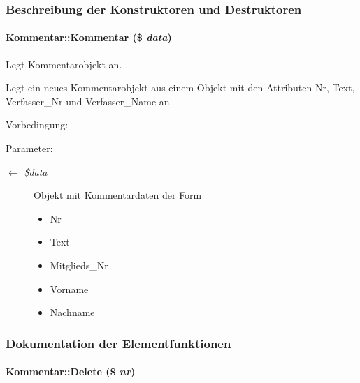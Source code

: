 \subsubsection{Beschreibung der Konstruktoren und Destruktoren}
\hypertarget{classKommentar_ea774e2108c754890c602dfdd53d64e1}{
\paragraph[Kommentar]{\setlength{\rightskip}{0pt plus 5cm}Kommentar::Kommentar (\$ {\em data})}\hfill}
\label{classKommentar_ea774e2108c754890c602dfdd53d64e1}


Legt Kommentarobjekt an. 

Legt ein neues Kommentarobjekt aus einem Objekt mit den Attributen Nr, Text, Verfasser\_\-Nr und Verfasser\_\-Name an. \begin{Desc}
\item[Vorbedingung:]- \end{Desc}
\begin{Desc}
\item[Parameter:]
\begin{description}
\item[\mbox{$\leftarrow$} {\em \$data}]Objekt mit Kommentardaten der Form\begin{itemize}
\item Nr\item Text\item Mitglieds\_\-Nr\item Vorname\item Nachname \end{itemize}
\end{description}
\end{Desc}


\subsubsection{Dokumentation der Elementfunktionen}
\hypertarget{classKommentar_31c1fdfb4fb8f24e0016c8ddb98ddcdc}{
\paragraph[Delete]{\setlength{\rightskip}{0pt plus 5cm}Kommentar::Delete (\$ {\em nr})}\hfill}
\label{classKommentar_31c1fdfb4fb8f24e0016c8ddb98ddcdc}


